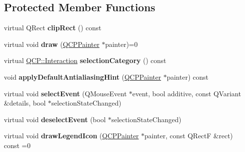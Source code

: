 \subsection*{Protected Member Functions}
\begin{DoxyCompactItemize}
\item 
\mbox{\label{class_q_c_p_abstract_plottable_aafb817dbea97d2798967f3371a701413}} 
virtual Q\+Rect {\bfseries clip\+Rect} () const
\item 
\mbox{\label{class_q_c_p_abstract_plottable_acbab5e30dcd04fd302b4a5902ac2c482}} 
virtual void {\bfseries draw} (\mbox{\hyperlink{class_q_c_p_painter}{Q\+C\+P\+Painter}} $\ast$painter)=0
\item 
\mbox{\label{class_q_c_p_abstract_plottable_afb5e4718c232a16d0fb06b00e172be9e}} 
virtual \mbox{\hyperlink{namespace_q_c_p_a2ad6bb6281c7c2d593d4277b44c2b037}{Q\+C\+P\+::\+Interaction}} {\bfseries selection\+Category} () const
\item 
\mbox{\label{class_q_c_p_abstract_plottable_a59a80773c5cefc05a0646ac8e1149ed5}} 
void {\bfseries apply\+Default\+Antialiasing\+Hint} (\mbox{\hyperlink{class_q_c_p_painter}{Q\+C\+P\+Painter}} $\ast$painter) const
\item 
\mbox{\label{class_q_c_p_abstract_plottable_a16aaad02456aa23a759efd1ac90c79bf}} 
virtual void {\bfseries select\+Event} (Q\+Mouse\+Event $\ast$event, bool additive, const Q\+Variant \&details, bool $\ast$selection\+State\+Changed)
\item 
\mbox{\label{class_q_c_p_abstract_plottable_a6fa0d0f95560ea8b01ee13f296dab2b1}} 
virtual void {\bfseries deselect\+Event} (bool $\ast$selection\+State\+Changed)
\item 
\mbox{\label{class_q_c_p_abstract_plottable_a9a450783fd9ed539e589999fd390cdf7}} 
virtual void {\bfseries draw\+Legend\+Icon} (\mbox{\hyperlink{class_q_c_p_painter}{Q\+C\+P\+Painter}} $\ast$painter, const Q\+RectF \&rect) const =0
\item 
\mbox{\label{class_q_c_p_abstract_plottable_a345d702b2e7e12c8cfdddff65ba85e8c}} 

\end{DoxyCompactItemize}
